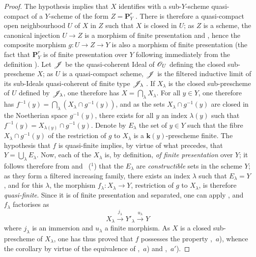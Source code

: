 \begin{proof}
The hypothesis implies that $X$ identifies with a sub-$Y$-scheme quasi-compact of a $Y$-scheme of the form $Z=\mathbf{P}^r_Y$ .
There is therefore a quasi-compact open neighbourhood $U$ of $X$ in $Z$ such that $X$ is closed in $U$; as $Z$ is a scheme, the canonical injection $U\to Z$ is a morphism of finite presentation  and , hence the composite morphism $g:U\to Z\to Y$ is also a morphism of finite presentation (the fact that $\mathbf{P}^r_Y$ is of finite presentation over $Y$ following immediately from the definition ).
Let $\mathscr{J}$ be the quasi-coherent Ideal of $\mathscr{O}_U$ defining the closed sub-prescheme $X$; as $U$ is a quasi-compact scheme, $\mathscr{J}$ is the filtered inductive limit of its sub-Ideals quasi-coherent of finite type $\mathscr{J}_\lambda$ .
If $X_\lambda$ is the closed sub-prescheme of $U$ defined by $\mathscr{J}_\lambda$, one therefore has $X=\bigcap_\lambda X_\lambda$.
For all $y\in Y$, one therefore has $f^{-1}(y)=\bigcap_\lambda(X_\lambda\cap g^{-1}(y))$, and as the sets $X_\lambda\cap g^{-1}(y)$ are closed in the Noetherian space $g^{-1}(y)$, there exists for all $y$ an index $\lambda(y)$ such that $f^{-1}(y)=X_{\lambda(y)}\cap g^{-1}(y)$.
Denote by $E_\lambda$ the set of $y\in Y$ such that the fibre $X_\lambda\cap g^{-1}(y)$ of the restriction of $g$ to $X_\lambda$ is a $\boldsymbol{k}(y)$-prescheme finite.
The hypothesis that $f$ is quasi-finite implies, by virtue of what precedes, that $Y=\bigcup_\lambda E_\lambda$.
Now, each of the $X_\lambda$ is, by definition, \emph{of finite presentation} over $Y$; it follows therefore from  and ~($^1$) that the $E_\lambda$ are \emph{constructible} sets in the scheme $Y$; as they form a filtered increasing family, there exists an index $\lambda$ such that $E_\lambda=Y$ , and for this $\lambda$, the morphism $f_\lambda:X_\lambda\to Y$, restriction of $g$ to $X_\lambda$, is therefore \emph{quasi-finite}. Since it is of finite presentation and separated, one can apply , and $f_\lambda$ factorises as
\[
X_\lambda\xrightarrow{j_\lambda}Y'_\lambda\xrightarrow{u_\lambda}Y
\]
where $j_\lambda$ is an immersion and $u_\lambda$ a finite morphism.
As $X$ is a closed sub-prescheme of $X_\lambda$, one has thus proved that $f$ possesses the property ,~$a$), whence the corollary by virtue of the equivalence of ,~$a$) and ,~$a'$).
\end{proof}

